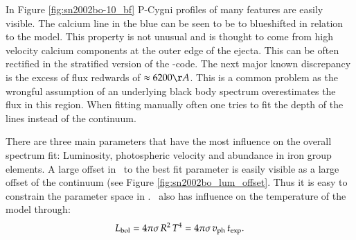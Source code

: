 
In Figure \ref{fig:sn2002bo-10_bf} P-Cygni profiles of many features are easily visible. The calcium line in the blue can be seen to be to blueshifted in relation to the model. This property is not unusual and is thought to come from high velocity calcium components at the outer edge of the ejecta. This can be often rectified in the stratified version of the \mlc-code. The next major known discrepancy is the excess of flux redwards of  $\approx 6200 \AA$.  This is a common problem as the wrongful assumption of an underlying black body spectrum overestimates the flux in this region. When fitting manually often one tries to fit the depth of the lines instead of the continuum.

There are three main parameters that have the most influence on the overall spectrum fit: Luminosity, photospheric velocity and abundance in iron group elements.
A large offset in \lum\ to the best fit parameter is easily visible as a large offset of the continuum (see Figure \ref{fig:sn2002bo_lum_offset}. Thus it is easy to constrain the parameter space in \lum. \lum\ also has influence on the temperature of the model through:
\[
L_{\rm bol} = 4\pi\sigma\, R^2\,T^4 = 4\pi\sigma\,v_{\rm ph}\,t_{\rm exp}.
\label{eq:lum_temp_relation}
\]

